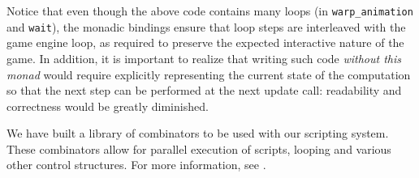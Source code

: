 Notice that even though the above code contains many
loops (in \texttt{warp\_animation} and \texttt{wait}), the monadic
bindings ensure that loop steps are interleaved with the game engine
loop, as required to preserve the expected interactive nature of the game. 
In addition, it is important to realize that writing such code
\textit{without this monad} would require explicitly representing 
the current state of the computation so that the next step can be
performed at the next update call: readability and correctness would
be greatly diminished.

We have built a library of combinators to be used with our scripting system. These combinators allow for parallel execution of scripts, looping and various other control structures. For more information, see \cite{UNFOLD_MONAD}.
